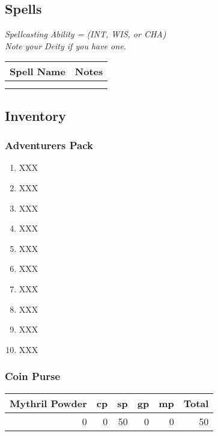 \documentclass[10pt]{article}
\renewenvironment{longtable}{\begin{center}\begin{tabular}}{\end{tabular}\end{center}}
\renewcommand{\endhead}{}
\renewcommand{\toprule}[2]{\hline}
\renewcommand{\midrule}[2]{\hline}
\renewcommand{\bottomrule}[2]{\hline}
\renewcommand{\endlastfoot}{}
\providecommand{\tightlist}{%
  \setlength{\itemsep}{0pt}\setlength{\parskip}{0pt}}
\begin{document}
\begin{multicols}{2}
\subsection{Spells}\label{spells}

\emph{Spellcasting Ability = (INT, WIS, or CHA)}\\
\emph{Note your Deity if you have one.}

\begin{longtable}[]{@{}ll@{}}
\toprule\noalign{}
Spell Name & Notes \\
\midrule\noalign{}
\endhead
\bottomrule\noalign{}
\endlastfoot
& \\
& \\
\end{longtable}

\subsection{Inventory}\label{inventory}

\subsubsection{Adventurer\textquotesingle s
Pack}\label{adventurers-pack}

\begin{enumerate}
\tightlist
\item
  XXX
\item
  XXX
\item
  XXX
\item
  XXX
\item
  XXX
\item
  XXX
\item
  XXX
\item
  XXX
\item
  XXX
\item
  XXX
\end{enumerate}

\subsubsection{Coin Purse}\label{coin-purse}

\begin{longtable}[]{@{}rrrrrr@{}}
\toprule\noalign{}
Mythril Powder & cp & sp & gp & mp & Total \\
\midrule\noalign{}
\endhead
\bottomrule\noalign{}
\endlastfoot
0 & 0 & 50 & 0 & 0 & 50 \\
\end{longtable}


\end{multicols}
\end{document}

